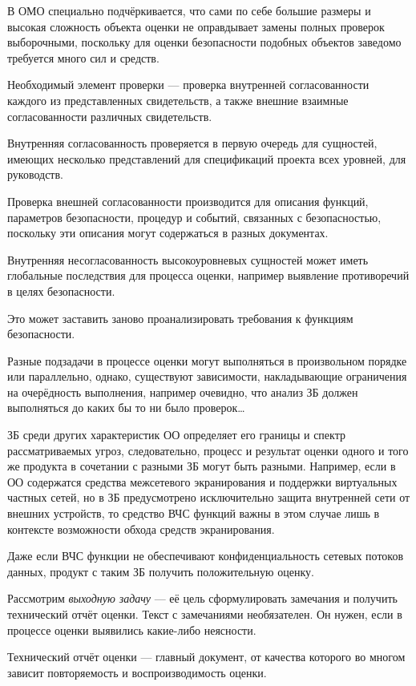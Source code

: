 \documentclass[12pt, russian, oneside, article]{ncc}
\begin{document}
В ОМО специально подчёркивается, что сами по себе большие размеры и высокая сложность объекта оценки не оправдывает замены полных проверок выборочными, поскольку для оценки безопасности подобных объектов заведомо требуется много сил и средств.

Необходимый элемент проверки --- проверка внутренней согласованности каждого из представленных свидетельств, а также внешние взаимные согласованности различных свидетельств.

Внутренняя согласованность проверяется в первую очередь для сущностей, имеющих несколько представлений для спецификаций проекта всех уровней, для руководств.

Проверка внешней согласованности производится для описания функций, параметров безопасности, процедур и событий, связанных с безопасностью, поскольку эти описания могут содержаться в разных документах.

Внутренняя несогласованность высокоуровневых сущностей может иметь глобальные последствия для процесса оценки, например выявление противоречий в целях безопасности.

Это может заставить заново проанализировать требования к функциям безопасности.

Разные подзадачи в процессе оценки могут выполняться в произвольном порядке или параллельно, однако, существуют зависимости, накладывающие ограничения на очерёдность выполнения, например очевидно, что анализ ЗБ должен выполняться до каких бы то ни было проверок\ldots{}

ЗБ среди других характеристик ОО определяет его границы и спектр рассматриваемых угроз, следовательно, процесс и результат оценки одного и того же продукта в сочетании с разными ЗБ могут быть разными. Например, если в ОО содержатся средства межсетевого экранирования и поддержки виртуальных частных сетей, но в ЗБ предусмотрено исключительно защита внутренней сети от внешних устройств, то средство ВЧС функций важны в этом случае лишь в контексте возможности обхода средств экранирования.

Даже если ВЧС функции не обеспечивают конфиденциальность сетевых потоков данных, продукт с таким ЗБ получить положительную оценку.

Рассмотрим \emph{выходную задачу} --- её цель сформулировать замечания и получить технический отчёт оценки. Текст с замечаниями необязателен. Он нужен, если в процессе оценки выявились какие-либо неясности.

Технический отчёт оценки --- главный документ, от качества которого во многом зависит повторяемость и воспроизводимость оценки.
\end{document}
